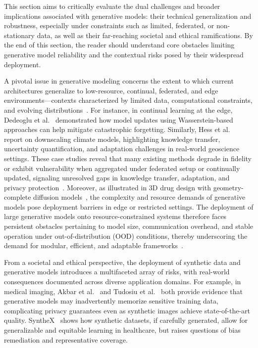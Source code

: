 \documentclass[sigconf]{acmart}
\begin{document}
This section aims to critically evaluate the dual challenges and broader implications associated with generative models: their technical generalization and robustness, especially under constraints such as limited, federated, or non-stationary data, as well as their far-reaching societal and ethical ramifications. By the end of this section, the reader should understand core obstacles limiting generative model reliability and the contextual risks posed by their widespread deployment.

A pivotal issue in generative modeling concerns the extent to which current architectures generalize to low-resource, continual, federated, and edge environments—contexts characterized by limited data, computational constraints, and evolving distributions~\cite{ref72,ref73}. For instance, in continual learning at the edge, Dedeoglu et al.~\cite{ref72} demonstrated how model updates using Wasserstein-based approaches can help mitigate catastrophic forgetting. Similarly, Hess et al.~\cite{ref73} report on downscaling climate models, highlighting knowledge transfer, uncertainty quantification, and adaptation challenges in real-world geoscience settings. These case studies reveal that many existing methods degrade in fidelity or exhibit vulnerability when aggregated under federated setup or continually updated, signaling unresolved gaps in knowledge transfer, adaptation, and privacy protection~\cite{ref73}. Moreover, as illustrated in 3D drug design with geometry-complete diffusion models~\cite{ref74}, the complexity and resource demands of generative models pose deployment barriers in edge or restricted settings. The deployment of large generative models onto resource-constrained systems therefore faces persistent obstacles pertaining to model size, communication overhead, and stable operation under out-of-distribution (OOD) conditions, thereby underscoring the demand for modular, efficient, and adaptable frameworks~\cite{ref73,ref74,ref88}.

From a societal and ethical perspective, the deployment of synthetic data and generative models introduces a multifaceted array of risks, with real-world consequences documented across diverse application domains. For example, in medical imaging, Akbar et al.~\cite{ref21} and Tudosiu et al.~\cite{ref60} both provide evidence that generative models may inadvertently memorize sensitive training data, complicating privacy guarantees even as synthetic images achieve state-of-the-art quality. SyntheX~\cite{ref81} shows how synthetic datasets, if carefully generated, allow for generalizable and equitable learning in healthcare, but raises questions of bias remediation and representative coverage.
\end{document}
